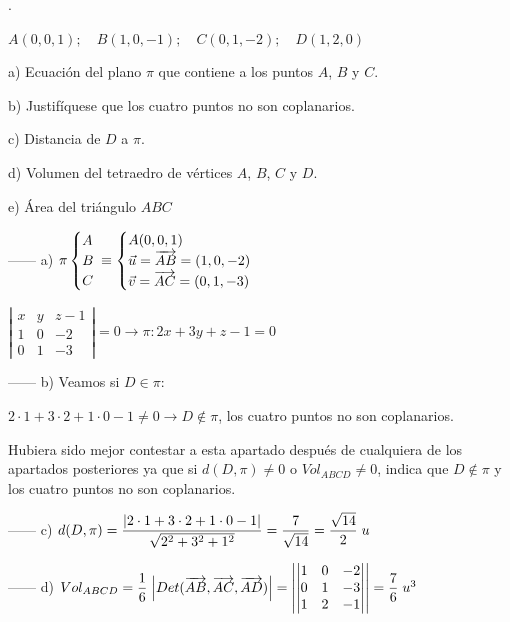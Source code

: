 \begin{ejre}.

\noindent $A(0,0,1);\quad B(1,0,-1);\quad C(0,1,-2);\quad D(1,2,0)$

\noindent a) Ecuación del plano $\pi$ que contiene a los puntos $A$, $B$ y $C$.

\noindent b) Justifíquese que los cuatro puntos no son coplanarios.

\noindent c) Distancia de $D$ a $\pi$.

\noindent d) Volumen del tetraedro de vértices $A$, $B$, $C$ y $D$.

\noindent e) Área del triángulo $ABC$

\end{ejre}
\begin{proofw}\renewcommand{\qedsymbol}{$\diamond$}	
	
\noindent ------ a) $\pi \begin{cases} A\\B\\C \end{cases} \hspace{-3mm} \equiv \begin{cases} A(0,0,1) \\ \vec u=\overrightarrow{AB}=(1,0,-2) \\ \vec v=\overrightarrow{AC}=(0,1,-3) \end{cases}$

\noindent $\left| \begin{matrix} x&y&z-1 \\ 1&0&-2 \\ 0&1&-3 \end{matrix} \right|=0 \to \pi: 2x+3y+z-1=0$

\noindent ------ b) Veamos si $D\in \pi$:

\noindent $2\cdot 1 +3\cdot 2 +1\cdot 0 -1\neq 0 \to D \notin \pi$, los cuatro puntos no son coplanarios.

\noindent Hubiera sido mejor contestar a esta apartado después de cualquiera de los apartados posteriores ya que si $d(D,\pi)\neq 0$ o $Vol_{ABCD}\neq 0$, indica que $D\notin \pi$ y los cuatro puntos no son coplanarios.

\noindent ------ c) $d(D,\pi)=\dfrac {\abs{2\cdot 1 +3\cdot 2 +1\cdot 0 -1}}{\sqrt{2^2+3^2+1^2}}=\dfrac {7}{\sqrt{14}} = \dfrac {\sqrt{14}} 2 \; u$

\noindent ------ d) $Vol_{ABCD}=\dfrac 1 6 \;\abs{Det(\overrightarrow{AB},\overrightarrow{AC},\overrightarrow{AD})}= \abs{\left| \begin{matrix} 1&0&-2\\0&1&-3\\1&2&-1 \end{matrix} \right|}=\dfrac 7 6 \; u^3$


\end{proofw}
